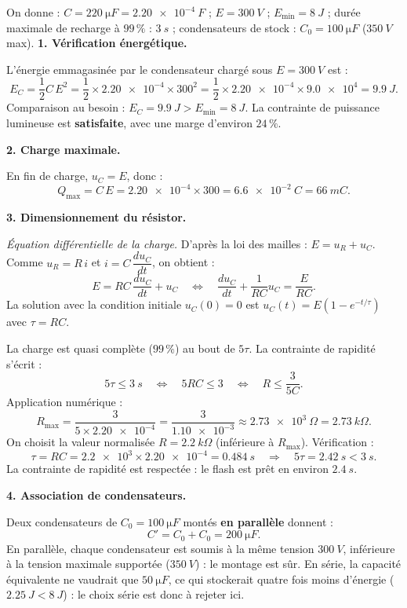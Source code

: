 \documentclass[11pt]{article}
\begin{document}
\begin{exoresolu}
On donne : $C = \SI{220}{\micro F} = \SI{2,20e-4}{F}$ ; $E = \SI{300}{V}$ ; $E_{\min} = \SI{8}{J}$ ; durée maximale de recharge à $99\,\%$ : $\SI{3}{s}$ ; condensateurs de stock : $C_0 = \SI{100}{\micro F}$ ($\SI{350}{V}$ max).
\tcblower
\textbf{1. Vérification énergétique.}

L'énergie emmagasinée par le condensateur chargé sous $E = \SI{300}{V}$ est :
\[
E_C = \frac{1}{2}C\,E^2 = \frac{1}{2} \times \num{2,20e-4} \times 300^2 = \frac{1}{2} \times \num{2,20e-4} \times \num{9,0e4} = \SI{9,9}{J}.
\]
Comparaison au besoin : $E_C = \SI{9,9}{J} > E_{\min} = \SI{8}{J}$. La contrainte de puissance lumineuse est \textbf{satisfaite}, avec une marge d'environ $24\,\%$.

\medskip
\textbf{2. Charge maximale.}

En fin de charge, $u_C = E$, donc :
\[
Q_{\max} = C\,E = \num{2,20e-4} \times 300 = \SI{6,6e-2}{C} = \SI{66}{mC}.
\]

\medskip
\textbf{3. Dimensionnement du résistor.}

\emph{Équation différentielle de la charge.} D'après la loi des mailles : $E = u_R + u_C$. Comme $u_R = R\,i$ et $i = C\,\dfrac{du_C}{dt}$, on obtient :
\[
E = RC\,\frac{du_C}{dt} + u_C \quad\Longleftrightarrow\quad \frac{du_C}{dt} + \frac{1}{RC}u_C = \frac{E}{RC}.
\]
La solution avec la condition initiale $u_C(0)=0$ est $u_C(t) = E\left(1 - e^{-t/\tau}\right)$ avec $\tau = RC$.

La charge est quasi complète ($99\,\%$) au bout de $5\tau$. La contrainte de rapidité s'écrit :
\[
5\tau \leq \SI{3}{s} \quad\Longleftrightarrow\quad 5RC \leq 3 \quad\Longleftrightarrow\quad R \leq \frac{3}{5C}.
\]
Application numérique :
\[
R_{\max} = \frac{3}{5 \times \num{2,20e-4}} = \frac{3}{\num{1,10e-3}} \approx \SI{2,73e3}{\Omega} = \SI{2,73}{k\Omega}.
\]
On choisit la valeur normalisée $R = \SI{2,2}{k\Omega}$ (inférieure à $R_{\max}$). Vérification :
\[
\tau = RC = \num{2,2e3} \times \num{2,20e-4} = \SI{0,484}{s} \quad\Rightarrow\quad 5\tau = \SI{2,42}{s} < \SI{3}{s}.
\]
La contrainte de rapidité est respectée : le flash est prêt en environ $\SI{2,4}{s}$.

\medskip
\textbf{4. Association de condensateurs.}

Deux condensateurs de $C_0 = \SI{100}{\micro F}$ montés \textbf{en parallèle} donnent :
\[
C' = C_0 + C_0 = \SI{200}{\micro F}.
\]
En parallèle, chaque condensateur est soumis à la même tension $\SI{300}{V}$, inférieure à la tension maximale supportée ($\SI{350}{V}$) : le montage est sûr. En série, la capacité équivalente ne vaudrait que $\SI{50}{\micro F}$, ce qui stockerait quatre fois moins d'énergie ($\SI{2,25}{J} < \SI{8}{J}$) : le choix série est donc à rejeter ici.


\end{exoresolu}
\end{document}
